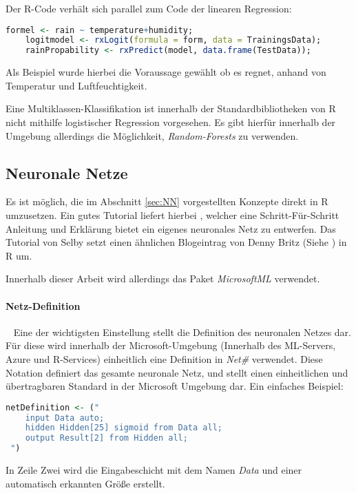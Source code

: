 Der R-Code verhält sich parallel zum Code der linearen Regression:

\begin{lstlisting}[language=R]
	formel <- rain ~ temperature+humidity;
	logitmodel <- rxLogit(formula = form, data = TrainingsData);
	rainPropability <- rxPredict(model, data.frame(TestData));
\end{lstlisting}

Als Beispiel wurde hierbei die Voraussage gewählt ob es regnet, anhand von Temperatur und Luftfeuchtigkeit.

Eine Multiklassen-Klassifikation ist innerhalb der Standardbibliotheken von R nicht mithilfe logistischer Regression vorgesehen. Es gibt hierfür innerhalb der Umgebung allerdings die Möglichkeit, \textit{Random-Forests} zu verwenden.
\subsection{Neuronale Netze}
Es ist möglich, die im Abschnitt \ref{sec:NN} vorgestellten Konzepte direkt in R umzusetzen. Ein gutes Tutorial liefert hierbei \cite{SelbyNN}, welcher eine Schritt-Für-Schritt Anleitung und Erklärung bietet ein eigenes neuronales Netz zu entwerfen. Das Tutorial von Selby setzt einen ähnlichen Blogeintrag von Denny Britz (Siehe \cite{DennyNN}) in R um. 

Innerhalb dieser Arbeit wird allerdings das Paket \textit{MicrosoftML} verwendet.

\paragraph{Netz-Definition} ~\newline
Eine der wichtigsten Einstellung stellt die Definition des neuronalen Netzes dar. Für diese wird innerhalb der Microsoft-Umgebung (Innerhalb des ML-Servers, Azure und R-Services) einheitlich eine Definition in \textit{Net\#} verwendet. Diese Notation definiert  das gesamte neuronale Netz, und stellt einen einheitlichen und übertragbaren Standard in der Microsoft Umgebung dar. Ein einfaches Beispiel: ~\newline

\begin{lstlisting}[language=R]
 netDefinition <- ("
 	input Data auto;
 	hidden Hidden[25] sigmoid from Data all;
 	output Result[2] from Hidden all;  
 ")
\end{lstlisting}

In Zeile Zwei wird die Eingabeschicht mit dem Namen \textit{Data} und einer automatisch erkannten Größe erstellt. 

